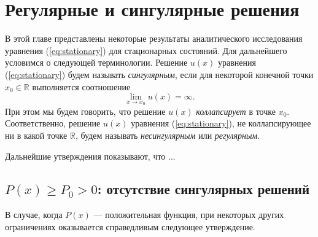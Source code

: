 \chapter{Регулярные и сингулярные решения}

В этой главе представлены некоторые результаты аналитического исследования уравнения (\ref{eq:stationary}) для стационарных состояний.
Для дальнейшего условимся о следующей терминологии.
Решение $u(x)$ уравнения (\ref{eq:stationary}) будем называть {\it сингулярным}, если для некоторой конечной точки $x_0 \in \mathbb{R}$ выполняется соотношение
%
$$\lim \limits_{x \to x_0} u(x) = \infty.$$
%
При этом мы будем говорить, что решение $u(x)$ {\it коллапсирует} в точке $x_0$.
Соответственно, решение $u(x)$ уравнения (\ref{eq:stationary}), не коллапсирующее ни в какой точке $\mathbb{R}$, будем называть {\it несингулярным} или {\it регулярным}.

Дальнейшие утверждения показывают, что ...

\section{$P(x) \ge P_0 > 0$: отсутствие сингулярных решений}

В случае, когда $P(x)$ --- положительная функция, при некоторых других ограничениях оказывается справедливым следующее утверждение.

